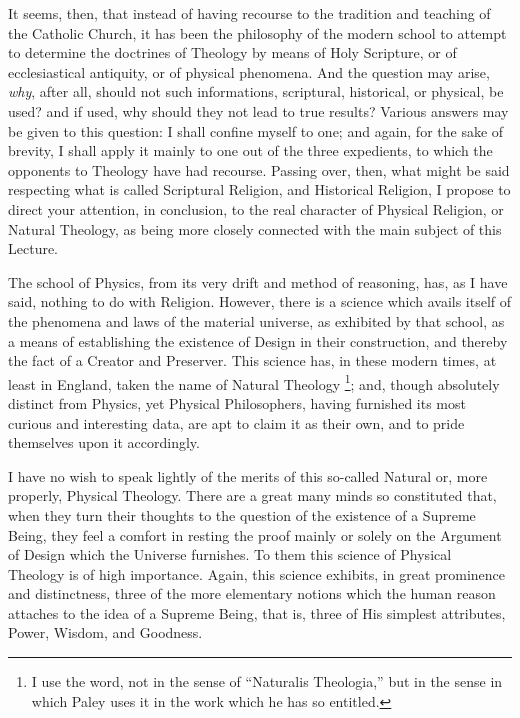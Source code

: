 It seems, then, that instead of having recourse to the tradition
and teaching of the Catholic Church, it has been the philosophy of the
modern school to attempt to determine the doctrines of Theology by
means of Holy Scripture, or of ecclesiastical antiquity, or of
physical phenomena. And the question may arise, \emph{why}, after all,
should not such informations, scriptural, historical, or physical, be
used? and if used, why should they not lead to true results? Various
answers may be given to this question: I shall confine myself to one;
and again, for the sake of brevity, I shall apply it mainly to one out
of the three expedients, to which the opponents to Theology have had
recourse. Passing over, then, what might be said respecting what is
called Scriptural Religion, and Historical Religion, I propose to
direct your attention, in conclusion, to the real character of
Physical Religion, or Natural Theology, as being more closely
connected with the main subject of this Lecture.

The school of Physics, from its very drift and method of reasoning,
has, as I have said, nothing to do with Religion. However, there is a
science which avails itself of the phenomena and laws of the material
universe, as exhibited by that school, as a means of establishing the
existence of Design in their construction, and thereby the fact of a
Creator and Preserver. This science has, in these modern times, at
least in England, taken the name of Natural Theology \footnote{I use the word,
not in the sense of ``Naturalis Theologia,'' but in the sense
in which Paley uses it in the work which he has so entitled.}; and, though absolutely distinct from Physics, yet Physical
Philosophers, having furnished its most curious and interesting data,
are apt to claim it as their own, and to pride themselves upon it
accordingly.

I have no wish to speak lightly of the merits of this so-called
Natural or, more properly, Physical Theology. There are a great many
minds so constituted that, when they turn their thoughts to the
question of the existence of a Supreme Being, they feel a comfort in
resting the proof mainly or solely on the Argument of Design which the
Universe furnishes. To them this science of Physical Theology is of
high importance. Again, this science exhibits, in great prominence and
distinctness, three of the more elementary notions which the human
reason attaches to the idea of a Supreme Being, that is, three of His
simplest attributes, Power, Wisdom, and Goodness.


